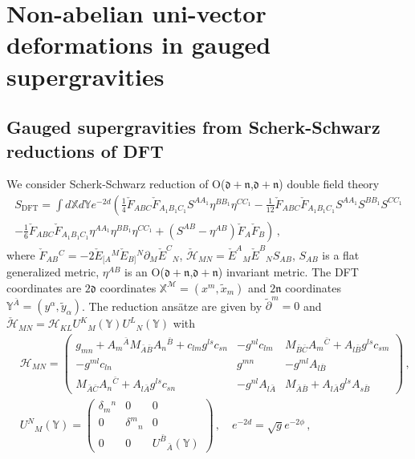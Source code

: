 \documentclass[12pt, utf8]{article}
\numberwithin{equation}{section}
\begin{document}
\section{Non-abelian uni-vector deformations in gauged supergravities}\label{gaugedsugra}

\subsection{Gauged supergravities from Scherk-Schwarz reductions of DFT}\label{gaugedsugraSS}

We consider Scherk-Schwarz reduction of O($\mathfrak{d}+\mathfrak{n}$,$\mathfrak{d}+\mathfrak{n}$) double field theory \cite{Grana:2012rr}
\begin{multline}
    S_{\text{DFT}} = \int d\mathbb{X} d\mathbb{Y} e^{-2d} \left( \frac{1}{4} \check{F}_{ABC} \check{F}_{A_1 B_1 C_1} S^{AA_1} \eta^{BB_1} \eta^{CC_1} - \frac{1}{12} \check{F}_{ABC} \check{F}_{A_1 B_1 C_1} S^{AA_1} S^{BB_1} S^{CC_1} \right.\\
    \left. - \frac{1}{6} \check{F}_{ABC} \check{F}_{A_1 B_1 C_1} \eta^{AA_1} \eta^{BB_1} \eta^{CC_1} + (S^{AB} - \eta^{AB}) \check{F}_A \check{F}_B \right) \, ,
\end{multline}
where $\check{F}_{A B}{}^{C} = - 2 \check{E}_{[A}{}^{M} \check{E}_{B]}{}^{N} \partial_{M}{\check{E}^{C}{}_{N}}$, $\check{\mathcal{H}}_{MN} = \check{E}^{A}{}_{M} \check{E}^{B}{}_{N} S_{AB}$, $S_{AB}$ is a flat generalized metric, $\eta^{AB}$ is an O($\mathfrak{d}+\mathfrak{n}$,$\mathfrak{d}+\mathfrak{n}$) invariant metric. The DFT coordinates are $2 \mathfrak{d}$ coordinates $\mathbb{X}^\mathcal{M} = (x^m, \tilde{x}_m)$ and $2 \mathfrak{n}$ coordinates $\mathbb{Y}^{\bar{A}} = (y^\alpha, \tilde{y}_\alpha)$. The reduction ansätze are given by $\tilde{\partial}^m = 0$ and $\check{\mathcal{H}}_{M N} = \mathcal{H}_{K L}U^{K}{}_{M}(\mathbb{Y})U^{L}{}_{N}(\mathbb{Y})$
with
\begin{equation}
  \begin{aligned}
      &   {\mathcal{H}}_{M N} =
    \left(\begin{array}{ccc}
  g_{m n}+A_m{}^{\bar{A}} M_{\bar{A} \bar{B}}  A_{n}{}^{\bar{B} }+c_{l m} g^{l s}  c_{s n}  &- g^{n l}  c_{l m} & M_{\bar{B} \bar{C}} A_m{}^{\bar{C}} + A_{l \bar{B} }  g^{l s}  c_{s m} \\
 - g^{m l}  c_{l n}    &  g^{m n} & - g^{m l}  A_{ l \bar{B}}  \\ 
M_{\bar{A} \bar{C}} A_{n}{}^{\bar{C}} + A_{ l \bar{A}}  g^{l s}  c_{s n} & -  g^{n l}  A_{ l \bar{A}} & M_{\bar{A} \bar{B}} + A_{ l \bar{A}}  g^{l s}  A_{ s \bar{B}}
    \end{array}\right) \, , \\ 
   & U^{N}{}_{M}(\mathbb{Y}) =
    \left(\begin{array}{ccc}
\delta_{m}{}^{n}  & 0 & 0 \\
0 & \delta^{m}{}_{n} & 0  \\ 
0 & 0 &  U^{\bar{B}}{}_{\bar{A}}(\mathbb{Y})
    \end{array}\right) \, , \quad   e^{-2d} = \sqrt{g} e^{-2\phi} \, ,
  \end{aligned}
\end{equation}
\end{document}
